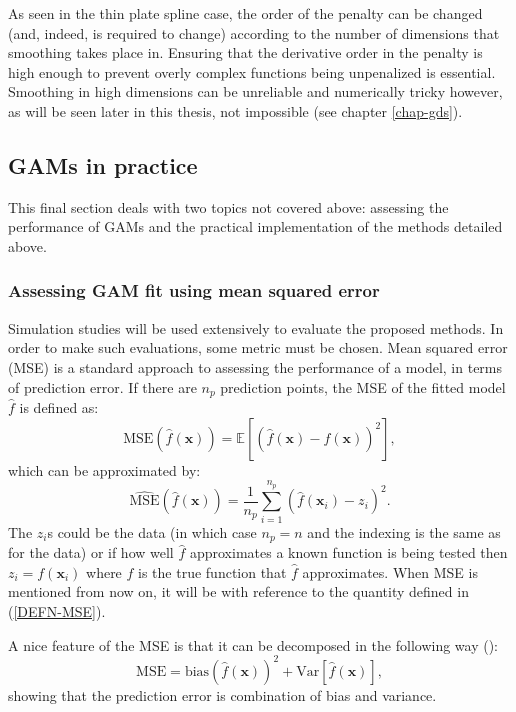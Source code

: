 As seen in the thin plate spline case, the order of the penalty can be changed (and, indeed, is required to change) according to the number of dimensions that smoothing takes place in. Ensuring that the derivative order in the penalty is high enough to prevent overly complex functions being unpenalized is essential. Smoothing in high dimensions can be unreliable and numerically tricky however, as will be seen later in this thesis, not impossible (see chapter \ref{chap-gds}).


\subsection{GAMs in practice}

This final section deals with two topics not covered above: assessing the performance of GAMs and the practical implementation of the methods detailed above.

\subsubsection{Assessing GAM fit using mean squared error}

Simulation studies will be used extensively to evaluate the proposed methods. In order to make such evaluations, some metric must be chosen. Mean squared error (MSE) is a standard approach to assessing the performance of a model, in terms of prediction error. If there are $n_p$ prediction points, the MSE of the fitted model $\hat{f}$ is defined as:
\begin{equation*}
\text{MSE}(\hat{f}(\mathbf{x})) = \mathbb{E}[(\hat{f}(\mathbf{x}) - f(\mathbf{x}))^2],
\end{equation*}
which can be approximated by:
\begin{equation}
\hat{\text{MSE}}(\hat{f}(\mathbf{x})) = \frac{1}{n_p} \sum_{i=1}^{n_p} (\hat{f}(\mathbf{x}_i) - z_i)^2.
\label{DEFN-MSE}
\end{equation}
The $z_i$s could be the data (in which case $n_p=n$ and the indexing is the same as for the data) or if how well $\hat{f}$ approximates a known function is being tested then $z_i=f(\mathbf{x}_i)$ where $f$ is the true function that $\hat{f}$ approximates. When MSE is mentioned from now on, it will be with reference to the quantity defined in (\ref{DEFN-MSE}).

A nice feature of the MSE is that it can be decomposed in the following way (\cite[p. 24]{elements}):
\begin{equation*}
\text{MSE} = \text{bias}(\hat{f}(\mathbf{x}))^2 + \text{Var}[\hat{f}(\mathbf{x})],
\end{equation*}
showing that the prediction error is combination of bias and variance.


